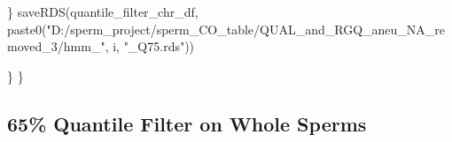 \documentclass[
  letterpaper,
  DIV=11,
  numbers=noendperiod]{scrreprt}
\newenvironment{Shaded}{\begin{snugshade}}{\end{snugshade}}
\newcommand{\FunctionTok}[1]{\textcolor[rgb]{0.28,0.35,0.67}{#1}}
\newcommand{\NormalTok}[1]{\textcolor[rgb]{0.00,0.23,0.31}{#1}}
\newcommand{\StringTok}[1]{\textcolor[rgb]{0.13,0.47,0.30}{#1}}
\begin{document}
\begin{codelisting}
\begin{Shaded}
\begin{Highlighting}[]
\NormalTok{    \}}
    \FunctionTok{saveRDS}\NormalTok{(quantile\_filter\_chr\_df, }\FunctionTok{paste0}\NormalTok{(}\StringTok{"D:/sperm\_project/sperm\_CO\_table/QUAL\_and\_RGQ\_aneu\_NA\_removed\_3/hmm\_"}\NormalTok{, i, }\StringTok{"\_Q75.rds"}\NormalTok{))}

\NormalTok{  \}}
\NormalTok{\}}
\end{Highlighting}
\end{Shaded}

\end{codelisting}

\hypertarget{quantile-filter-on-whole-sperms-1}{%
\subsection{65\% Quantile Filter on Whole
Sperms}\label{quantile-filter-on-whole-sperms-1}}
\end{document}
